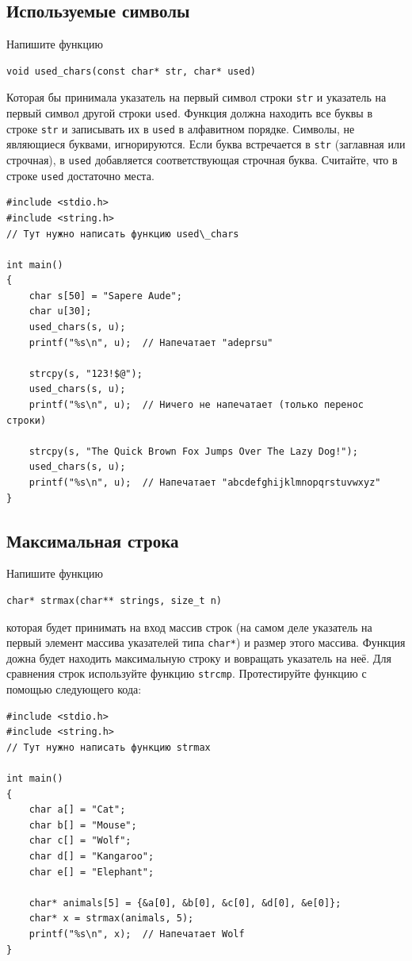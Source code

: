 \documentclass[10pt]{article}
\begin{document}
\subsection{Используемые символы}
Напишите функцию
\begin{lstlisting}
void used_chars(const char* str, char* used)
\end{lstlisting}
Которая бы принимала указатель на первый символ строки \texttt{str} и указатель на первый символ другой строки \texttt{used}. Функция должна находить все буквы в строке \texttt{str} и записывать их в \texttt{used} в алфавитном порядке. Символы, не являющиеся буквами, игнорируются. Если буква встречается в \texttt{str} (заглавная или строчная), в \texttt{used} добавляется соответствующая строчная буква. Считайте, что в строке \texttt{used} достаточно места.
\begin{lstlisting}
#include <stdio.h>
#include <string.h>
// Тут нужно написать функцию used\_chars

int main() 
{
    char s[50] = "Sapere Aude";
    char u[30];
    used_chars(s, u);
    printf("%s\n", u);  // Напечатает "adeprsu"
    
    strcpy(s, "123!$@");
    used_chars(s, u);
    printf("%s\n", u);  // Ничего не напечатает (только перенос строки)
    
    strcpy(s, "The Quick Brown Fox Jumps Over The Lazy Dog!");
    used_chars(s, u);
    printf("%s\n", u);  // Напечатает "abcdefghijklmnopqrstuvwxyz"    
}
\end{lstlisting}
 
\subsection{Максимальная строка}
Напишите функцию
\begin{lstlisting}
char* strmax(char** strings, size_t n)
\end{lstlisting}
которая будет принимать на вход массив строк (на самом деле указатель на первый элемент массива указателей типа \texttt{char*}) и размер этого массива.
Функция дожна будет находить максимальную строку и вовращать указатель на неё.
Для сравнения строк используйте функцию \texttt{strcmp}.
Протестируйте функцию с помощью следующего кода:
\begin{lstlisting}
#include <stdio.h>
#include <string.h>
// Тут нужно написать функцию strmax

int main() 
{
    char a[] = "Cat";
    char b[] = "Mouse";
    char c[] = "Wolf";
    char d[] = "Kangaroo";
    char e[] = "Elephant";
    
    char* animals[5] = {&a[0], &b[0], &c[0], &d[0], &e[0]};
    char* x = strmax(animals, 5);
    printf("%s\n", x);  // Напечатает Wolf
}
\end{lstlisting} 
\end{document}
